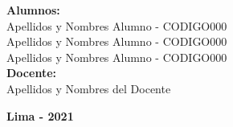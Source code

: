 \begin{titlepage}
\begin{center}
		\begin{spacing}{1.25}
			{\large \textbf{Alumnos:}}\\
			{\large
			Apellidos y Nombres Alumno - CODIGO000\\
			Apellidos y Nombres Alumno - CODIGO000\\
			Apellidos y Nombres Alumno - CODIGO000\\
			}
			\vspace{15pt}			
			{\large \textbf{Docente:}}\\
			{\large
			Apellidos y Nombres del Docente\\	
			}		
		\end{spacing}
		
		\vfill		
		{\large \textbf{Lima - 2021}}
			
	\end{center}
\end{titlepage}
